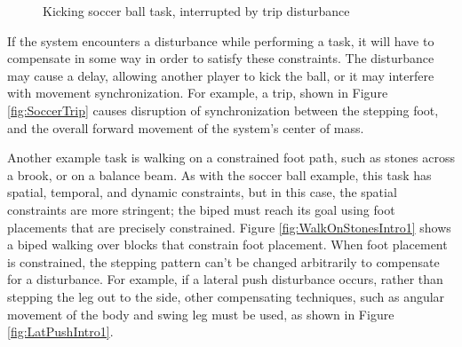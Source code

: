 \documentclass{llncs}
\begin{document}
\begin{figure}[b]
\centering
 \vspace{-10pt}
\caption{Kicking soccer ball task, interrupted by trip disturbance}
\label{fig:Soccer1}
\end{figure}

If the system encounters a disturbance while performing a task, it will have to compensate in some way in order to satisfy these constraints.  
The disturbance may cause a delay, allowing another player to kick the ball, or it may interfere with movement synchronization.  
For example, a trip, shown in Figure \ref{fig:SoccerTrip} causes disruption of synchronization between the stepping foot, and the overall forward movement 
of the system’s center of mass. 

Another example task is walking on a constrained foot path, such as stones across a brook, or on a balance beam.  
As with the soccer ball example, this task has spatial, temporal, and dynamic constraints, but in this case, the spatial constraints are more stringent;  
the biped must reach its goal using foot placements that are precisely constrained. 
Figure \ref{fig:WalkOnStonesIntro1} shows a biped walking over blocks that constrain foot placement.  
When foot placement is constrained, the stepping pattern can’t be changed arbitrarily to compensate for a disturbance.  
For example, if a lateral push disturbance occurs, rather than stepping the leg out to the side, other compensating techniques, 
such as angular movement of the body and swing leg must be used, as shown in Figure \ref{fig:LatPushIntro1}.
\end{document}
